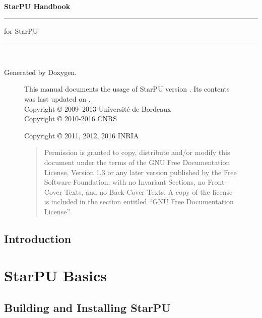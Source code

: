 
\begin{titlepage}
\vspace*{4cm}
{\Huge \textbf{StarPU Handbook}}\\
\rule{\textwidth}{1.5mm}
\begin{flushright}
{\Large for StarPU \STARPUVERSION}
\end{flushright}
\rule{\textwidth}{1mm}
~\\
\vspace*{15cm}
\begin{flushright}
Generated by Doxygen.
\end{flushright}
\end{titlepage}

\begin{figure}[p]
This manual documents the usage of StarPU version \STARPUVERSION. Its contents
was last updated on \STARPUUPDATED.\\

Copyright © 2009–2013 Université de Bordeaux\\

Copyright © 2010-2016 CNRS

Copyright © 2011, 2012, 2016 INRIA

\medskip

\begin{quote}
Permission is granted to copy, distribute and/or modify this document
under the terms of the GNU Free Documentation License, Version 1.3 or
any later version published by the Free Software Foundation; with no
Invariant Sections, no Front-Cover Texts, and no Back-Cover Texts. A
copy of the license is included in the section entitled “GNU Free
Documentation License”.
\end{quote}
\end{figure}

\tableofcontents
{}
\hypersetup{pageanchor=true,citecolor=blue}

\chapter{Introduction}
\label{index}
\hypertarget{index}{}


\part{StarPU Basics}

\chapter{Building and Installing StarPU}
\label{BuildingAndInstallingStarPU}
\hypertarget{BuildingAndInstallingStarPU}{}


